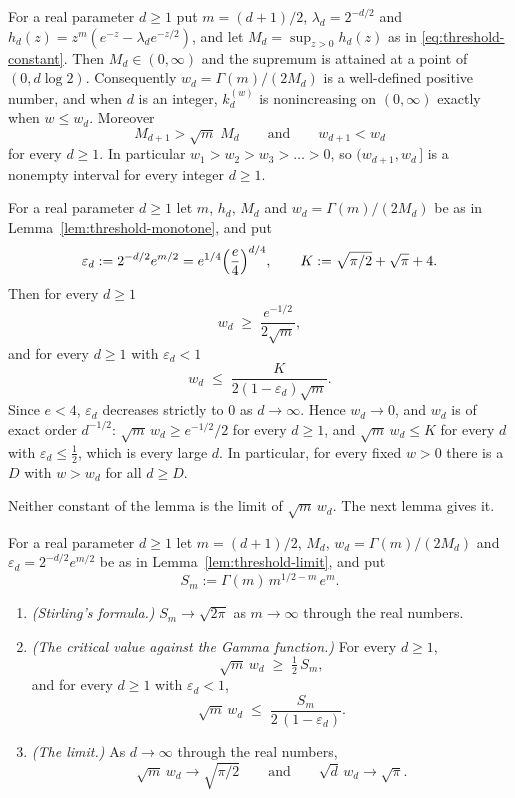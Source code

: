 \begin{lemma}\label{lem:threshold-monotone}
For a real parameter $d \ge 1$ put $m = (d+1)/2$, $\lambda_d = 2^{-d/2}$ and
$h_d(z) = z^m(e^{-z} - \lambda_d e^{-z/2})$, and let $M_d = \sup_{z>0}h_d(z)$ as in
\ref{eq:threshold-constant}. Then $M_d \in (0,\infty)$ and the supremum is attained at a point of
$(0,d\log 2)$. Consequently $w_d = \Gamma(m)/(2M_d)$ is a well-defined positive number, and when
$d$ is an integer, $k^{(w)}_d$ is nonincreasing on $(0,\infty)$ exactly when $w \le w_d$. Moreover
\[
  M_{d+1} > \sqrt{m}\;M_d \qquad\text{and}\qquad w_{d+1} < w_d
\]
for every $d \ge 1$. In particular $w_1 > w_2 > w_3 > \dots > 0$, so
$(w_{d+1}, w_d\,]$ is a nonempty interval for every integer $d \ge 1$.
\end{lemma}

\begin{lemma}\label{lem:threshold-limit}
For a real parameter $d \ge 1$ let $m$, $h_d$, $M_d$ and $w_d = \Gamma(m)/(2M_d)$ be as in
Lemma~\ref{lem:threshold-monotone}, and put
\[
  \varepsilon_d := 2^{-d/2}e^{m/2} = e^{1/4}\Bigl(\frac e4\Bigr)^{d/4},
  \qquad K := \sqrt{\pi/2} + \sqrt\pi + 4 .
\]
Then for every $d \ge 1$
\[
  w_d \;\ge\; \frac{e^{-1/2}}{2\sqrt m},
\]
and for every $d \ge 1$ with $\varepsilon_d < 1$
\[
  w_d \;\le\; \frac{K}{2(1-\varepsilon_d)\sqrt m} .
\]
Since $e < 4$, $\varepsilon_d$ decreases strictly to $0$ as $d \to \infty$. Hence
$w_d \to 0$, and $w_d$ is of exact order $d^{-1/2}$: $\sqrt m\,w_d \ge e^{-1/2}/2$ for every
$d \ge 1$, and $\sqrt m\,w_d \le K$ for every $d$ with $\varepsilon_d \le \tfrac12$, which is every
large $d$. In particular, for every fixed $w > 0$ there is a $D$ with $w > w_d$ for all
$d \ge D$.
\end{lemma}

Neither constant of the lemma is the limit of $\sqrt m\,w_d$. The next lemma gives it.

\begin{lemma}\label{lem:threshold-asymptotic}
For a real parameter $d \ge 1$ let $m = (d+1)/2$, $M_d$, $w_d = \Gamma(m)/(2M_d)$ and
$\varepsilon_d = 2^{-d/2}e^{m/2}$ be as in Lemma~\ref{lem:threshold-limit}, and put
\[
  S_m := \Gamma(m)\,m^{1/2-m}\,e^{m} .
\]
\begin{enumerate}
\item \emph{(Stirling's formula.)} $S_m \to \sqrt{2\pi}$ as $m \to \infty$ through the real
numbers.
\item \emph{(The critical value against the Gamma function.)} For every $d \ge 1$,
\[
  \sqrt m\,w_d \;\ge\; \tfrac12\,S_m ,
\]
and for every $d \ge 1$ with $\varepsilon_d < 1$,
\[
  \sqrt m\,w_d \;\le\; \frac{S_m}{2\,(1-\varepsilon_d)} .
\]
\item \emph{(The limit.)} As $d \to \infty$ through the real numbers,
\[
  \sqrt m\,w_d \to \sqrt{\pi/2} \qquad\text{and}\qquad \sqrt d\,w_d \to \sqrt\pi .
\]
\end{enumerate}
\end{lemma}

